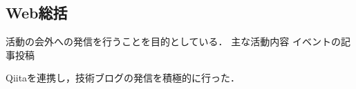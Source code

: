 \subsection*{Web総括}


活動の会外への発信を行うことを目的としている．
主な活動内容
    イベントの記事投稿

    
Qiitaを連携し，技術ブログの発信を積極的に行った．